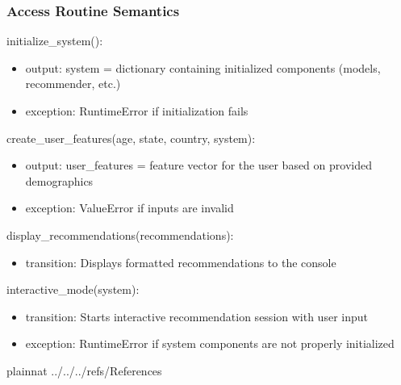 \documentclass[12pt, titlepage]{article}
\begin{document}
\subsubsection{Access Routine Semantics}

\noindent initialize\_system():
\begin{itemize}
\item output: system = dictionary containing initialized components (models, recommender, etc.)
\item exception: RuntimeError if initialization fails
\end{itemize}

\noindent create\_user\_features(age, state, country, system):
\begin{itemize}
\item output: user\_features = feature vector for the user based on provided demographics
\item exception: ValueError if inputs are invalid
\end{itemize}

\noindent display\_recommendations(recommendations):
\begin{itemize}
\item transition: Displays formatted recommendations to the console
\end{itemize}

\noindent interactive\_mode(system):
\begin{itemize}
\item transition: Starts interactive recommendation session with user input
\item exception: RuntimeError if system components are not properly initialized
\end{itemize}

\newpage

 {plainnat}
 {../../../refs/References}

\newpage

\newpage{}
\end{document}

